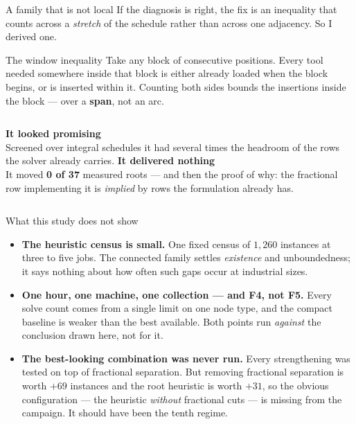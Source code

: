 \begin{frame}{A family that is not local}
\vspace{0.22cm}
If the diagnosis is right, the fix is an inequality that counts across a \emph{stretch} of
the schedule rather than across one adjacency. So I derived one.

\vspace{0.28cm}
\begin{block}{The window inequality}
Take any block of consecutive positions. Every tool needed somewhere inside that block is
either already loaded when the block begins, or is inserted within it. Counting both sides
bounds the insertions inside the block --- over a \textbf{span}, not an arc.
\end{block}

\vspace{0.28cm}
\begin{columns}[T,onlytextwidth]
\textbf{It looked promising}\\[.12cm]
Screened over integral schedules it had several times the headroom of the rows the solver
already carries.
\textbf{It delivered nothing}\\[.12cm]
It moved \textbf{0 of 37} measured roots --- and then the proof of why: the fractional row
implementing it is \emph{implied} by rows the formulation already has.
\end{columns}
\end{frame}


\begin{frame}{What this study does not show}
\vspace{0.24cm}
\small
\begin{itemize}\itemsep7pt
  \item \textbf{The heuristic census is small.} One fixed census of $1{,}260$ instances at
        three to five jobs. The connected family settles \emph{existence} and
        unboundedness; it says nothing about how often such gaps occur at industrial
        sizes.
  \item \textbf{One hour, one machine, one collection --- and F4, not F5.} Every solve
        count comes from a single limit on one node type, and the compact baseline is
        weaker than the best available. Both points run \emph{against} the conclusion
        drawn here, not for it.
  \item \textbf{The best-looking combination was never run.} Every strengthening was tested
        on top of fractional separation. But removing fractional separation is worth $+69$
        instances and the root heuristic is worth $+31$, so the obvious configuration ---
        the heuristic \emph{without} fractional cuts --- is missing from the campaign. It
        should have been the tenth regime.
\end{itemize}
\end{frame}

